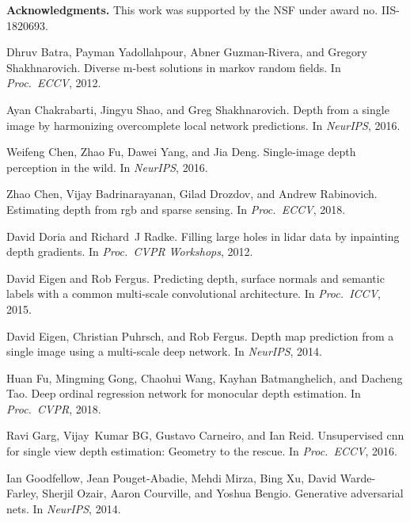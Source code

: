 \documentclass[10pt,twocolumn,letterpaper]{article}
\begin{document}
\noindent\textbf{Acknowledgments.} This work was supported by the NSF under award no. IIS-1820693.

{\small
\begin{thebibliography}{10}\itemsep=-1pt

Dhruv Batra, Payman Yadollahpour, Abner Guzman-Rivera, and Gregory
  Shakhnarovich.
\newblock Diverse m-best solutions in markov random fields.
\newblock In {\em Proc.~ECCV}, 2012.

Ayan Chakrabarti, Jingyu Shao, and Greg Shakhnarovich.
\newblock Depth from a single image by harmonizing overcomplete local network
  predictions.
\newblock In {\em NeurIPS}, 2016.

Weifeng Chen, Zhao Fu, Dawei Yang, and Jia Deng.
\newblock Single-image depth perception in the wild.
\newblock In {\em NeurIPS}, 2016.

Zhao Chen, Vijay Badrinarayanan, Gilad Drozdov, and Andrew Rabinovich.
\newblock Estimating depth from rgb and sparse sensing.
\newblock In {\em Proc.~ECCV}, 2018.

David Doria and Richard~J Radke.
\newblock Filling large holes in lidar data by inpainting depth gradients.
\newblock In {\em Proc.~CVPR Workshops}, 2012.

David Eigen and Rob Fergus.
\newblock Predicting depth, surface normals and semantic labels with a common
  multi-scale convolutional architecture.
\newblock In {\em Proc.~ICCV}, 2015.

David Eigen, Christian Puhrsch, and Rob Fergus.
\newblock Depth map prediction from a single image using a multi-scale deep
  network.
\newblock In {\em NeurIPS}, 2014.

Huan Fu, Mingming Gong, Chaohui Wang, Kayhan Batmanghelich, and Dacheng Tao.
\newblock Deep ordinal regression network for monocular depth estimation.
\newblock In {\em Proc.~CVPR}, 2018.

Ravi Garg, Vijay~Kumar BG, Gustavo Carneiro, and Ian Reid.
\newblock Unsupervised cnn for single view depth estimation: Geometry to the
  rescue.
\newblock In {\em Proc.~ECCV}, 2016.

Ian Goodfellow, Jean Pouget-Abadie, Mehdi Mirza, Bing Xu, David Warde-Farley,
  Sherjil Ozair, Aaron Courville, and Yoshua Bengio.
\newblock Generative adversarial nets.
\newblock In {\em NeurIPS}, 2014.


\end{thebibliography}}
\end{document}
